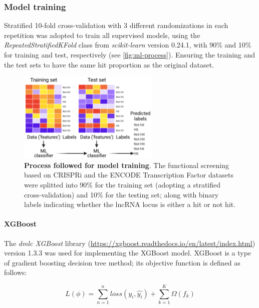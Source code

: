 \subsubsection{Model training}
\label{sec:ml_part}

Stratified 10-fold cross-validation with 3 different randomizations in each repetition was adopted to train all supervised models, using the \textit{RepeatedStratifiedKFold} class from \textit{scikit-learn}\autocite{pedregosa_2011_scikit} version 0.24.1, with 90\% and 10\% for training and test, respectively (see \autoref{fig:ml-process}). Ensuring the training and the test sets to have the same hit proportion as the original dataset.

\begin{figure}[!htb]
  \centering
  \includegraphics[width=0.6\textwidth]{img/methods/ml_project/ml_process.png}
  \caption[Process followed for model training]{\textbf{Process followed for model training}. The functional screening based on CRISPRi and the ENCODE Transcription Factor datasets were splitted into 90\% for the training set (adopting a stratified cross-validation) and 10\% for the testing set; along with binary labels indicating whether the lncRNA locus is either a hit or not hit.}
  \label{fig:ml-process}
\end{figure}

\paragraph{XGBoost}
\label{sec:XGBoost_methods}

The \textit{dmlc XGBoost} library (\url{https://xgboost.readthedocs.io/en/latest/index.html}) version 1.3.3 was used for implementing the XGBoost\autocite{chen_2016_xgboost} model. XGBoost is a type of gradient boosting decision tree method; its objective function is defined as follows:

\[ L(\phi)= \sum_{n=1}^n loss(y_i, \hat{y_i}) + \sum_{k=1}^K \Omega(f_k)  \]

